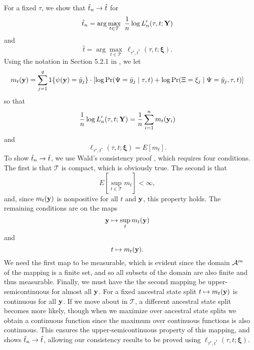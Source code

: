 For a fixed $\tau$, we show that $\hat{t}_n \rightarrow \hat{t}$ for
\[
\hat{t}_n = \arg\max_{t\in\mathcal{T}} \ \frac{1}{n}\log L_n'(\tau, t; \mathbf{Y})
\]
and
\[
\hat{t} = \arg\max_{t\in\mathcal{T}} \ \ell_{\tau^*,t^*}(\tau, t; \boldsymbol\xi).
\]
Using the notation in Section 5.2.1 in \citet{van1998asymptotic}, we let
\[
m_t(\mathbf{y}) = \sum_{j=1}^q 1\{\psi(\mathbf{y})=\tilde{y}_j\} \cdot [\log \Pr(\Psi=\tilde{y}_j \mid \tau, t) + \log \Pr(\Xi=\xi_j \mid \Psi=\tilde{y}_j , \tau, t)]
\]
so that
\[
\frac{1}{n}\log L_n'(\tau, t; \mathbf{Y}) = \frac{1}{n} \sum_{i=1}^n m_t(\mathbf{y}_i)
\]
and
\[
\ell_{\tau^*,t^*}(\tau, t; \boldsymbol\xi) = E[m_t].
\]
To show $\hat{t}_n \rightarrow \hat{t}$, we use Wald's consistency proof \citep[p. 48, Theorem 5.14 of ][]{van1998asymptotic}, which requires four conditions.
The first is that $\mathcal{T}$ is compact, which is obviously true.
The second is that
\[
E\left[\sup_{t\in\mathcal{T}} m_t\right] < \infty,
\]
and, since $m_t(\mathbf{y})$ is nonpositive for all $t$ and $\mathbf{y}$, this property holds.
The remaining conditions are on the maps
\[
\mathbf{y} \mapsto \sup_t m_t(\mathbf{y})
\]
and
\[
t \mapsto m_t(\mathbf{y}).
\]
We need the first map to be measurable, which is evident since the domain $\mathcal{A}^m$ of the mapping is a finite set, and so all subsets of the domain are also finite and thus measurable.
Finally, we must have the the second mapping be upper-semicontinuous for almost all $\mathbf{y}$.
For a fixed ancestral state split $t \mapsto m_t(\mathbf{y})$ is continuous for all $\mathbf{y}$.
If we move about in $\mathcal{T}$, a different ancestral state split becomes more likely, though when we maximize over ancestral state splits we obtain a continuous function since the maximum over continuous functions is also continuous.
This ensures the upper-semicontinuous property of this mapping, and shows $\hat{t}_n \rightarrow \hat{t}$, allowing our consistency results to be proved using $\ell_{\tau^*,t^*}(\tau, t; \boldsymbol\xi)$.

